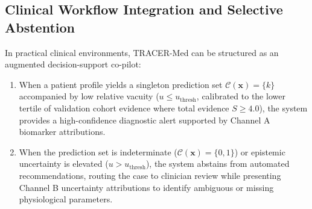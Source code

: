 \documentclass[pdflatex,sn-vancouver-num,referee,lineno]{sn-jnl}
\theoremstyle{thmstyleone}
\theoremstyle{thmstylethree}
\begin{document}
\subsection{Clinical Workflow Integration and Selective Abstention}
In practical clinical environments, TRACER-Med can be structured as an augmented decision-support co-pilot:
\begin{enumerate}
    \item When a patient profile yields a singleton prediction set $\mathcal{C}(\mathbf{x}) = \{k\}$ accompanied by low relative vacuity ($u \le u_{\text{thresh}}$, calibrated to the lower tertile of validation cohort evidence where total evidence $S \ge 4.0$), the system provides a high-confidence diagnostic alert supported by Channel A biomarker attributions.
    \item When the prediction set is indeterminate ($\mathcal{C}(\mathbf{x}) = \{0, 1\}$) or epistemic uncertainty is elevated ($u > u_{\text{thresh}}$), the system abstains from automated recommendations, routing the case to clinician review while presenting Channel B uncertainty attributions to identify ambiguous or missing physiological parameters.
\end{enumerate}
\end{document}
